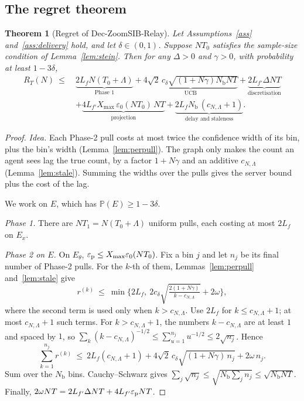 \documentclass[11pt]{article}
\newtheorem{theorem}{Theorem}
\theoremstyle{definition}
\newcommand{\Prob}{\mathbb{P}}
\newcommand{\Nb}{N_{\mathrm b}}
\newcommand{\Xmax}{X_{\max}}
\newcommand{\eps}{\varepsilon}
\begin{document}
\subsection{The regret theorem}

\begin{theorem}[Regret of Dec-ZoomSIB-Relay]\label{thm:regret}
Let Assumptions~\ref{ass} and~\ref{ass:delivery} hold, and let $\delta\in(0,1)$. Suppose $NT_0$ satisfies the
sample-size condition of Lemma~\ref{lem:stein}. Then for any $\Delta>0$ and $\gamma>0$, with probability at least
$1-3\delta$,
\begin{align*}
R_T(N)\ \le\ {}&\underbrace{2L_fN(T_0+\Lambda)}_{\text{Phase 1}}
+\underbrace{4\sqrt2\,c_\delta\sqrt{(1+N\gamma)\Nb NT}}_{\text{UCB}}
+\underbrace{2L_{f'}\Delta NT}_{\text{discretisation}}\\
&+\underbrace{4L_{f'}\Xmax\,\eps_0(NT_0)\,NT}_{\text{projection}}
+\underbrace{2L_f\Nb\,(c_{N,\Lambda}+1)}_{\text{delay and staleness}} .
\end{align*}
\end{theorem}
\begin{proof}
\emph{Idea.} Each Phase-2 pull costs at most twice the confidence width of its bin, plus the bin's width
(Lemma~\ref{lem:perpull}). The graph only makes the count an agent sees lag the true count, by a factor $1+N\gamma$ and an
additive $c_{N,\Lambda}$ (Lemma~\ref{lem:stale}). Summing the widths over the pulls gives the server bound plus the cost of the lag.

We work on $E$, which has $\Prob(E)\ge1-3\delta$.

\emph{Phase 1.} There are $N T_1=N(T_0+\Lambda)$ uniform pulls, each costing at most $2L_f$ on $E_x$.

\emph{Phase 2 on $E$.} On $E_\theta$, $\eps_{\rm p}\le\Xmax\eps_0(NT_0)$. Fix a bin $j$ and let $n_j$ be its final number of
Phase-2 pulls. For the $k$-th of them, Lemmas~\ref{lem:perpull} and~\ref{lem:stale} give
\[
r^{(k)}\ \le\ \min\Big\{2L_f,\ 2c_\delta\sqrt{\tfrac{2(1+N\gamma)}{k-c_{N,\Lambda}}}+2\omega\Big\},
\]
where the second term is used only when $k>c_{N,\Lambda}$. Use $2L_f$ for $k\le c_{N,\Lambda}+1$; at most
$c_{N,\Lambda}+1$ such terms. For $k>c_{N,\Lambda}+1$, the numbers $k-c_{N,\Lambda}$ are at least $1$ and spaced by $1$,
so $\sum_k(k-c_{N,\Lambda})^{-1/2}\le\sum_{u=1}^{n_j}u^{-1/2}\le2\sqrt{n_j}$. Hence
\[
\sum_{k=1}^{n_j}r^{(k)}\ \le\ 2L_f(c_{N,\Lambda}+1)+4\sqrt2\,c_\delta\sqrt{(1+N\gamma)\,n_j}+2\omega\,n_j .
\]
Sum over the $\Nb$ bins. Cauchy--Schwarz gives $\sum_j\sqrt{n_j}\le\sqrt{\Nb\sum_jn_j}\le\sqrt{\Nb NT}$. Finally,
$2\omega NT=2L_{f'}\Delta NT+4L_{f'}\eps_{\rm p}NT$.
\end{proof}
\end{document}
